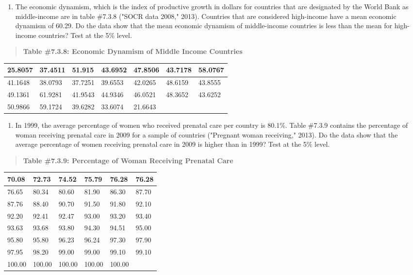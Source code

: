 \documentclass[]{book}
\providecommand{\tightlist}{%
  \setlength{\itemsep}{0pt}\setlength{\parskip}{0pt}}
\begin{document}
\begin{enumerate}
\def\labelenumi{\arabic{enumi}.}
\setcounter{enumi}{5}
\tightlist
\item
  The economic dynamism, which is the index of productive growth in
  dollars for countries that are designated by the World Bank as
  middle-income are in table \#7.3.8 ("SOCR data 2008," 2013).
  Countries that are considered high-income have a mean economic
  dynamism of 60.29. Do the data show that the mean economic dynamism
  of middle-income countries is less than the mean for high-income
  countries? Test at the 5\% level.
\end{enumerate}

\begin{quote}
\textbf{Table \#7.3.8: Economic Dynamism of Middle Income Countries}
\end{quote}

\begin{longtable}[]{@{}lllllll@{}}
\toprule
25.8057 & 37.4511 & 51.915 & 43.6952 & 47.8506 & 43.7178 & 58.0767\tabularnewline
\midrule
\endhead
41.1648 & 38.0793 & 37.7251 & 39.6553 & 42.0265 & 48.6159 & 43.8555\tabularnewline
49.1361 & 61.9281 & 41.9543 & 44.9346 & 46.0521 & 48.3652 & 43.6252\tabularnewline
50.9866 & 59.1724 & 39.6282 & 33.6074 & 21.6643 & &\tabularnewline
\bottomrule
\end{longtable}

\begin{enumerate}
\def\labelenumi{\arabic{enumi}.}
\setcounter{enumi}{6}
\tightlist
\item
  In 1999, the average percentage of women who received prenatal care
  per country is 80.1\%. Table \#7.3.9 contains the percentage of woman
  receiving prenatal care in 2009 for a sample of countries
  ("Pregnant woman receiving," 2013). Do the data show that the
  average percentage of women receiving prenatal care in 2009 is
  higher than in 1999? Test at the 5\% level.
\end{enumerate}

\begin{quote}
\textbf{Table \#7.3.9: Percentage of Woman Receiving Prenatal Care}
\end{quote}

\begin{longtable}[]{@{}llllll@{}}
\toprule
70.08 & 72.73 & 74.52 & 75.79 & 76.28 & 76.28\tabularnewline
\midrule
\endhead
76.65 & 80.34 & 80.60 & 81.90 & 86.30 & 87.70\tabularnewline
87.76 & 88.40 & 90.70 & 91.50 & 91.80 & 92.10\tabularnewline
92.20 & 92.41 & 92.47 & 93.00 & 93.20 & 93.40\tabularnewline
93.63 & 93.68 & 93.80 & 94.30 & 94.51 & 95.00\tabularnewline
95.80 & 95.80 & 96.23 & 96.24 & 97.30 & 97.90\tabularnewline
97.95 & 98.20 & 99.00 & 99.00 & 99.10 & 99.10\tabularnewline
100.00 & 100.00 & 100.00 & 100.00 & 100.00 &\tabularnewline
\bottomrule
\end{longtable}
\end{document}
